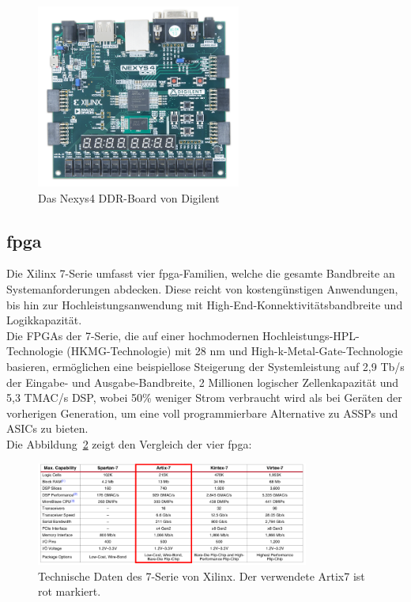 \begin{figure}[H]
\centering
\includegraphics[width=0.6\textwidth]{Hauptteil/nexys-4-ddr-2.png}
\caption{Das Nexys4 DDR-Board von Digilent~\cite{digilent}}\label{fig:nexys4}
\end{figure}



\subsection{\ac{fpga}}\label{kap:fpga}
Die Xilinx 7-Serie umfasst vier \ac{fpga}-Familien, welche die gesamte Bandbreite an Systemanforderungen abdecken. Diese reicht von kostengünstigen Anwendungen, bis hin zur Hochleistungsanwendung mit High-End-Konnektivitätsbandbreite und Logikkapazität. \\
Die FPGAs der 7-Serie, die auf einer hochmodernen Hochleistungs-HPL-Technologie (HKMG-Technologie) mit 28 nm und High-k-Metal-Gate-Technologie basieren,
 ermöglichen eine beispiellose Steigerung der Systemleistung auf 2,9 Tb/s der Eingabe- und Ausgabe-Bandbreite, 2 Millionen logischer Zellenkapazität und 5,3 TMAC/s DSP,
 wobei 50\% weniger Strom verbraucht wird als bei Geräten der vorherigen Generation, um eine voll programmierbare Alternative zu ASSPs und ASICs zu bieten.\\
 Die Abbildung~\ref{fig:7serie} zeigt den Vergleich der vier \ac{fpga}:~\cite{artix7}\\

 \begin{figure}[H]
 \centering
 \includegraphics[width=0.8\textwidth]{Hauptteil/7serie.png}
 \caption{Technische Daten des 7-Serie von Xilinx. Der verwendete Artix7 ist rot markiert.~\cite{artix7}~\cite{artix7}~\cite{artix7}}\label{fig:7serie}
 \end{figure}


